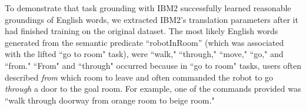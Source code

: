 \documentclass[conference]{IEEEtran}
\begin{document}


To demonstrate that task grounding with IBM2 successfully learned reasonable groundings of English words, we extracted IBM2's translation parameters after it had finished training on the original dataset. The most likely English words generated from the 
semantic predicate ``robotInRoom'' (which was associated with the lifted ``go to room" task), were ``walk," ``through," ``move," ``go," and ``from."  ``From" and ``through" occurred because in ``go to room" tasks, users often described {\em from} which room to leave and often commanded the robot to go {\em through} a door to the goal room. For example, one of the commands provided was ``walk through doorway from orange room to beige room."
\end{document}
